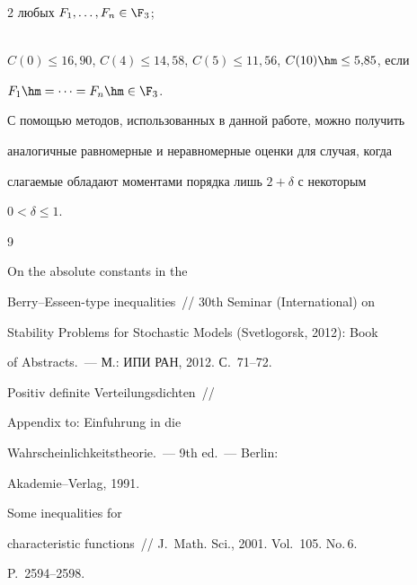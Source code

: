 \begin{multicols}{2}
любых $F_1,\ldots,F_n\in\F_3$;

\\

$C(0)\le16{,}90$, $C(4)\le14{,}58$, $C(5)\le11{,}56$, $C(10)\hm\le5{,}85$, если

$F_1\hm=\cdots=F_n\hm\in\F_3$.



С помощью методов, использованных в данной работе, можно получить

аналогичные равномерные и неравномерные оценки для случая, когда

слагаемые обладают моментами порядка лишь $2+\delta$ с некоторым

$0<\delta\le1$.



{\small\frenchspacing

{%


\begin{thebibliography}{9}




 On the absolute constants in the

Berry--Esseen-type inequalities~// 30th  Seminar (International) on

Stability Problems for Stochastic Models (Svetlogorsk, 2012): Book

of Abstracts.~--- М.: ИПИ РАН, 2012. С.~71--72.








 Positiv definite Verteilungsdichten~//

Appendix to:   Einf$\ddot{\mbox{u}}$hrung in die

Wahrscheinlichkeitstheorie.~--- 9th ed.~--- Berlin:

Akademie--Verlag, 1991.




 Some inequalities for

characteristic functions~// J.~Math. Sci., 2001. Vol.~105. No.\,6.

P.~2594--2598.




\end{thebibliography}}}
\end{multicols}
